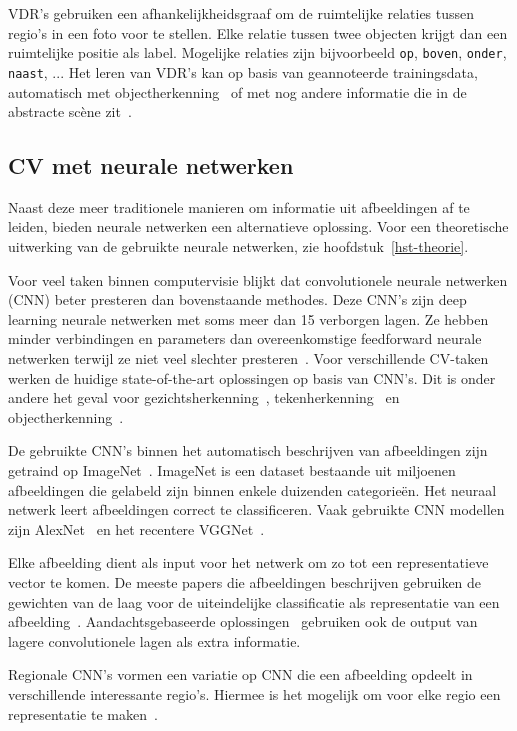 VDR's gebruiken een afhankelijkheidsgraaf om de ruimtelijke relaties tussen regio's in een foto voor te stellen. Elke relatie tussen twee objecten krijgt dan een ruimtelijke positie als label. Mogelijke relaties zijn bijvoorbeeld \texttt{op}, \texttt{boven}, \texttt{onder}, \texttt{naast}, ... Het leren van VDR's kan op basis van geannoteerde trainingsdata, automatisch met objectherkenning~\cite{Elliott2015} of met nog andere informatie die in de abstracte sc\`ene zit~\cite{Gilberto2015}.  


\subsection{CV met neurale netwerken}
Naast deze meer traditionele manieren om informatie uit afbeeldingen af te leiden, bieden neurale netwerken een alternatieve oplossing. Voor een theoretische uitwerking van de gebruikte neurale netwerken, zie hoofdstuk~\ref{hst-theorie}.

Voor veel taken binnen computervisie blijkt dat convolutionele neurale netwerken (CNN) beter presteren dan bovenstaande methodes. Deze CNN's zijn deep learning neurale netwerken met soms meer dan 15 verborgen lagen. Ze hebben minder verbindingen en parameters dan overeenkomstige feedforward neurale netwerken terwijl ze niet veel slechter presteren~\cite{Krizhevsky2012a}. 
Voor verschillende CV-taken werken de huidige state-of-the-art oplossingen op basis van CNN's. Dit is onder andere het geval voor gezichtsherkenning~\cite{Zhou2015}, tekenherkenning~\cite{Ciresan2012} en objectherkenning~\cite{Szegedy2014}.

De gebruikte CNN's binnen het automatisch beschrijven van afbeeldingen zijn getraind op ImageNet~\cite{Russakovsky2014}. ImageNet is een dataset bestaande uit miljoenen afbeeldingen die gelabeld zijn binnen enkele duizenden categorie\"en. Het neuraal netwerk leert afbeeldingen correct te classificeren. Vaak gebruikte CNN modellen zijn AlexNet~\cite{Krizhevsky2012a} en het recentere VGGNet~\cite{Arge2015}.

Elke afbeelding dient als input voor het netwerk om zo tot een representatieve vector te komen. De meeste papers die afbeeldingen beschrijven gebruiken de gewichten van de laag voor de uiteindelijke classificatie als representatie van een afbeelding~\cite{Chen2014,Karpathy2015,Mao2014a,Google}. Aandachtsgebaseerde oplossingen~\cite{Jin2015,Xu2015} gebruiken ook de output van lagere convolutionele lagen als extra informatie.

Regionale CNN's vormen een variatie op CNN die een afbeelding opdeelt in verschillende interessante regio's. Hiermee is het mogelijk om voor elke regio een representatie te maken~\cite{Karpathy2015,Mitchell2015}. 

